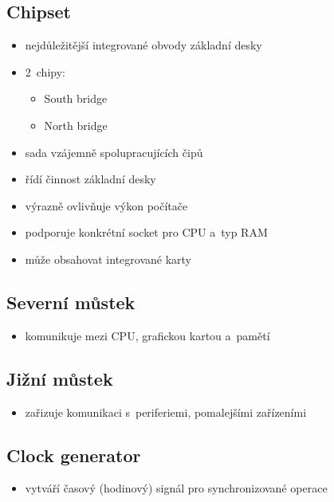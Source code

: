 \documentclass[a4paper,12pt]{article}
\providecommand{\tightlist}{%
\setlength{\itemsep}{0pt}\setlength{\parskip}{0pt}}
\begin{document}
\subsection{Chipset}

\begin{itemize}
  \tightlist
  \item nejdůležitější integrované obvody základní desky
  \item 2~chipy:
  \begin{itemize}
    \tightlist
    \item South bridge
    \item North bridge
  \end{itemize}
  \item sada vzájemně spolupracujících čipů
  \item řídí činnost základní desky
  \item výrazně ovlivňuje výkon počítače
  \item podporuje konkrétní socket pro CPU a~typ RAM
  \item může obsahovat integrované karty
\end{itemize}

\subsection{Severní můstek}

\begin{itemize}
  \item komunikuje mezi CPU, grafickou kartou a~pamětí
\end{itemize}

\subsection{Jižní můstek}

\begin{itemize}
  \item zařizuje komunikaci s~periferiemi, pomalejšími zařízeními
\end{itemize}

\subsection{Clock generator}

\begin{itemize}
  \item vytváří časový (hodinový) signál pro synchronizované operace
\end{itemize}
\end{document}
